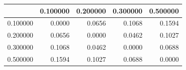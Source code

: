\begin{tabular}{lrrrr}
\toprule
 & 0.100000 & 0.200000 & 0.300000 & 0.500000 \\
\midrule
0.100000 & 0.0000 & 0.0656 & 0.1068 & 0.1594 \\
0.200000 & 0.0656 & 0.0000 & 0.0462 & 0.1027 \\
0.300000 & 0.1068 & 0.0462 & 0.0000 & 0.0688 \\
0.500000 & 0.1594 & 0.1027 & 0.0688 & 0.0000 \\
\bottomrule
\end{tabular}
